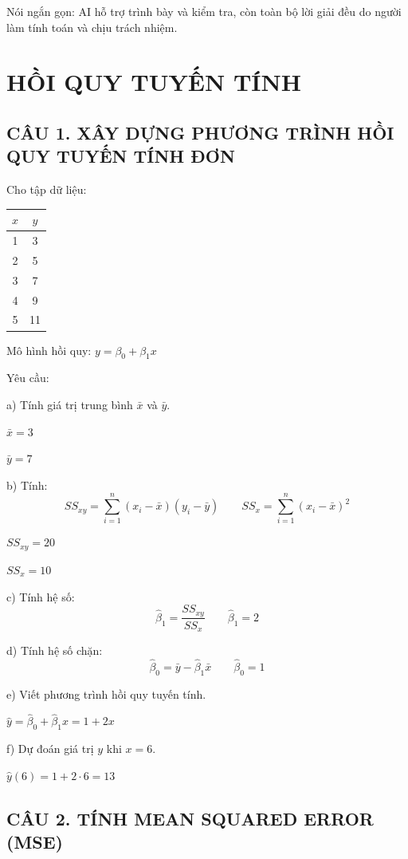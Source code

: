 \documentclass[a4paper,12pt]{article}
\begin{document}
Nói ngắn gọn: AI hỗ trợ trình bày và kiểm tra, còn toàn bộ lời giải đều do người làm
tính toán và chịu trách nhiệm.

\newpage

\section*{HỒI QUY TUYẾN TÍNH}

\subsection*{CÂU 1. XÂY DỰNG PHƯƠNG TRÌNH HỒI QUY TUYẾN TÍNH ĐƠN}

Cho tập dữ liệu:
\begin{center}
\begin{tabular}{|c|c|}
\hline
$x$ & $y$ \\
\hline
1 & 3 \\
2 & 5 \\
3 & 7 \\
4 & 9 \\
5 & 11 \\
\hline
\end{tabular}
\end{center}

Mô hình hồi quy: $y = \beta_0 + \beta_1 x$

Yêu cầu:

a) Tính giá trị trung bình $\bar{x}$ và $\bar{y}$.

$\bar{x} = 3$

$\bar{y} = 7$

b) Tính:
\[ SS_{xy} = \sum_{i=1}^{n}(x_i - \bar{x})(y_i - \bar{y}) \qquad
   SS_{x} = \sum_{i=1}^{n}(x_i - \bar{x})^2 \]

$SS_{xy} = 20$

$SS_{x} = 10$

c) Tính hệ số:
\[ \hat{\beta}_1 = \frac{SS_{xy}}{SS_{x}} \qquad \hat{\beta}_1 = 2 \]

d) Tính hệ số chặn:
\[ \hat{\beta}_0 = \bar{y} - \hat{\beta}_1 \bar{x} \qquad \hat{\beta}_0 = 1 \]

e) Viết phương trình hồi quy tuyến tính.

$\hat{y} = \hat{\beta}_0 + \hat{\beta}_1 x = 1 + 2x$

f) Dự đoán giá trị $y$ khi $x = 6$.

$\hat{y}(6) = 1 + 2 \cdot 6 = 13$

\subsection*{CÂU 2. TÍNH MEAN SQUARED ERROR (MSE)}
\end{document}
